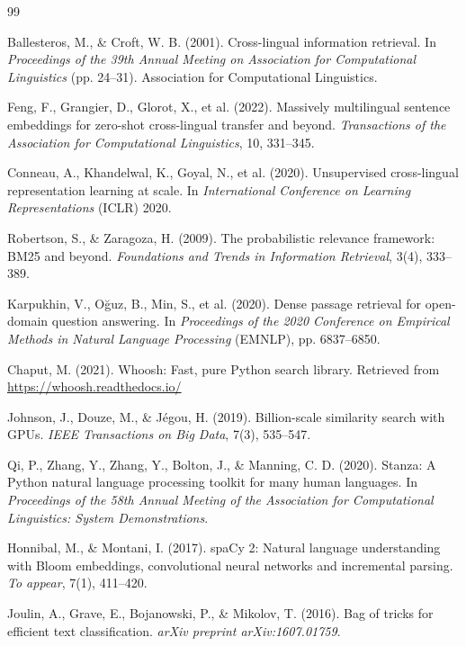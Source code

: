 \documentclass[12pt,a4paper]{report}
\begin{document}
\begin{thebibliography}{99}

Ballesteros, M., \& Croft, W. B. (2001). Cross-lingual information retrieval. In \textit{Proceedings of the 39th Annual Meeting on Association for Computational Linguistics} (pp. 24--31). Association for Computational Linguistics.

Feng, F., Grangier, D., Glorot, X., et al. (2022). Massively multilingual sentence embeddings for zero-shot cross-lingual transfer and beyond. \textit{Transactions of the Association for Computational Linguistics}, 10, 331--345.

Conneau, A., Khandelwal, K., Goyal, N., et al. (2020). Unsupervised cross-lingual representation learning at scale. In \textit{International Conference on Learning Representations} (ICLR) 2020.

Robertson, S., \& Zaragoza, H. (2009). The probabilistic relevance framework: BM25 and beyond. \textit{Foundations and Trends in Information Retrieval}, 3(4), 333--389.

Karpukhin, V., O\u{g}uz, B., Min, S., et al. (2020). Dense passage retrieval for open-domain question answering. In \textit{Proceedings of the 2020 Conference on Empirical Methods in Natural Language Processing} (EMNLP), pp. 6837--6850.

Chaput, M. (2021). Whoosh: Fast, pure Python search library. Retrieved from \url{https://whoosh.readthedocs.io/}

Johnson, J., Douze, M., \& J\'egou, H. (2019). Billion-scale similarity search with GPUs. \textit{IEEE Transactions on Big Data}, 7(3), 535--547.

Qi, P., Zhang, Y., Zhang, Y., Bolton, J., \& Manning, C. D. (2020). Stanza: A Python natural language processing toolkit for many human languages. In \textit{Proceedings of the 58th Annual Meeting of the Association for Computational Linguistics: System Demonstrations}.

Honnibal, M., \& Montani, I. (2017). spaCy 2: Natural language understanding with Bloom embeddings, convolutional neural networks and incremental parsing. \textit{To appear}, 7(1), 411--420.

Joulin, A., Grave, E., Bojanowski, P., \& Mikolov, T. (2016). Bag of tricks for efficient text classification. \textit{arXiv preprint arXiv:1607.01759}.


\end{thebibliography}
\end{document}
